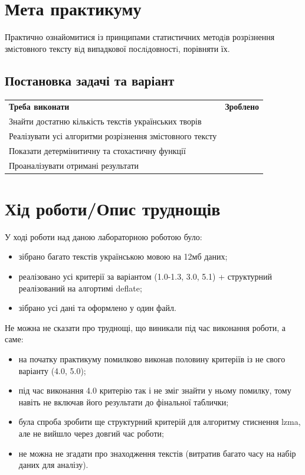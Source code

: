 \section{Мета практикуму}

Практично ознайомитися із принципами статистичних методiв розрiзнення змiстовного тексту вiд випадкової послiдовностi, порівняти їх.

\subsection{Постановка задачі та варіант}
\begin{tabularx}{\textwidth}{X|X}
	\textbf{Треба виконати} & \textbf{Зроблено} \\
	Знайти достатню кількість текстів українських творів & \checkmark \\
	Реалізувати усі алгоритми розрізнення змістовного тексту & \checkmark \\
	Показати детермінитичну та стохастичну функції & \checkmark \\
	Проаналізувати отримані результати & \checkmark \\
\end{tabularx}



\section{Хід роботи/Опис труднощів}
    У ході роботи над даною лабораторною роботою було:
    \begin{itemize}
        \item зібрано багато текстів українською мовою на 12мб даних;
        \item реалізовано усі критерії за варіантом (1.0-1.3, 3.0, 5.1) + структурний реалізований на алгортимі deflate;
        \item зібрано усі дані та оформлено у один файл.
    \end{itemize}    
    Не можна не сказати про труднощі, що виникали під час виконання роботи, а саме:
    \begin{itemize}
        \item на початку практикуму помилково виконав половину критеріїв із не свого варіанту (4.0, 5.0);  
        \item під час виконання 4.0 критерію так і не зміг знайти у ньому помилку, тому навіть не включав його результати до фінальної таблички;
        \item була спроба зробити ще структурний критерій для алгоритму стиснення lzma, але не вийшло через довгий час роботи;
        \item не можна не згадати про знаходження текстів (витратив багато часу на набір даних для аналізу).
    \end{itemize}


